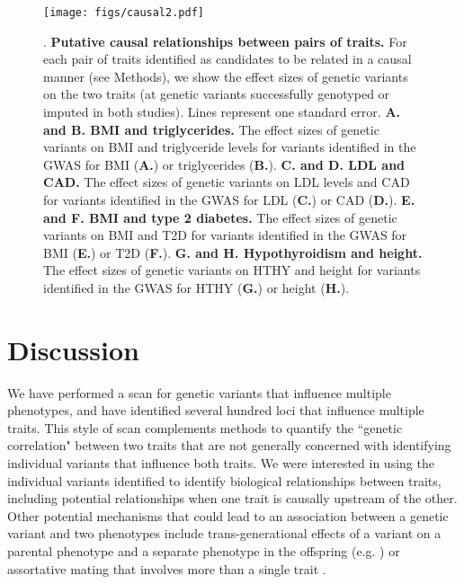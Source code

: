 \documentclass[11pt,titlepage]{article}
\begin{document}
\begin{figure}
\begin{center}
\texttt{[image: figs/causal2.pdf]}
\caption{. \textbf{Putative causal relationships between pairs of traits.} For each pair of traits identified as candidates to be related in a causal manner (see Methods), we show the effect sizes of genetic variants on the two traits (at genetic variants successfully genotyped or imputed in both studies). Lines represent one standard error. \textbf{A. and B. BMI and triglycerides.}  The effect sizes of genetic variants on BMI and triglyceride levels for variants identified in the GWAS for BMI (\textbf{A.}) or triglycerides (\textbf{B.}).  \textbf{C. and D. LDL and CAD.}  The effect sizes of genetic variants on LDL levels and CAD for variants identified in the GWAS for LDL (\textbf{C.}) or CAD (\textbf{D.}). \textbf{E. and F. BMI and type 2 diabetes.}  The effect sizes of genetic variants on BMI and T2D for variants identified in the GWAS for BMI (\textbf{E.}) or T2D (\textbf{F.}). \textbf{G. and H. Hypothyroidism and height.}  The effect sizes of genetic variants on HTHY and height for variants identified in the GWAS for HTHY (\textbf{G.}) or height (\textbf{H.}). } \label{f_causal}
\end{center}
\end{figure}

\section{Discussion}
We have performed a scan for genetic variants that influence multiple phenotypes, and have identified several hundred loci that influence multiple traits. This style of scan complements methods to quantify the ``genetic correlation" between two traits \citep{Lee:2012aa,Visscher:2014aa, bulik2015atlas, Loh:2015aa} that are not generally concerned with identifying individual variants that influence both traits. We were interested in using the individual variants identified to identify biological relationships between traits, including potential relationships when one trait is causally upstream of the other. Other potential mechanisms that could lead to an association between a genetic variant and two phenotypes include trans-generational effects of a variant on a parental phenotype and a separate phenotype in the offspring (e.g. \citet{Ueland:2001aa, Zhang:2015aa}) or assortative mating that involves more than a single trait \citep{Gianola:1982aa}.
\end{document}
